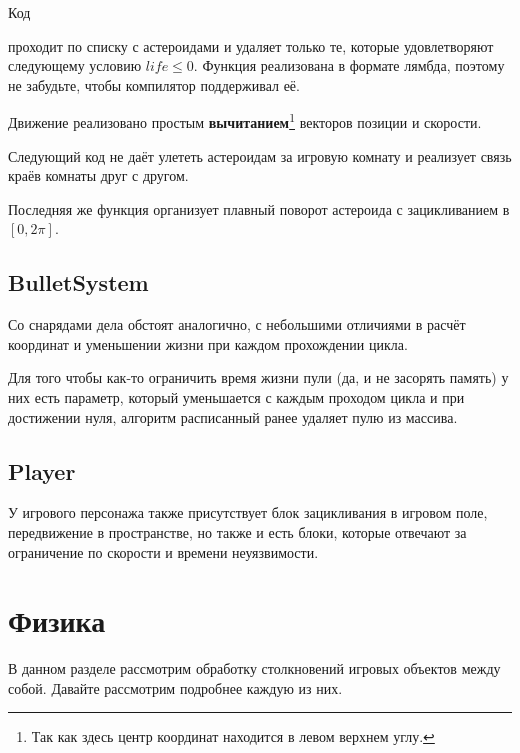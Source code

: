 Код

проходит по списку с астероидами и удаляет только те, которые удовлетворяют следующему условию 
\( life \leq 0 \). Функция реализована в формате лямбда, поэтому не забудьте, чтобы компилятор поддерживал её.

Движение реализовано простым \textbf{вычитанием}\footnote{Так как здесь центр координат находится в левом 
верхнем углу.} векторов позиции и скорости. 

Следующий код не даёт улететь астероидам за игровую комнату и реализует связь краёв комнаты друг с другом.


Последняя же функция организует плавный поворот астероида с зацикливанием в \( [0, 2\pi] \).


\newpage

\subsection{BulletSystem}
Со снарядами дела обстоят аналогично, с небольшими отличиями в расчёт координат и уменьшении жизни при 
каждом прохождении цикла.


Для того чтобы как-то ограничить время жизни пули (да, и не засорять память) у них есть параметр, который 
уменьшается с каждым проходом цикла и при достижении нуля, алгоритм расписанный ранее удаляет пулю из массива.

\newpage

\subsection{Player}
У игрового персонажа также присутствует блок зацикливания в игровом поле, передвижение в пространстве, но 
также и есть блоки, которые отвечают за ограничение по скорости и времени неуязвимости.


\newpage

\section{Физика}
В данном разделе рассмотрим обработку столкновений игровых объектов между собой. Давайте рассмотрим 
подробнее каждую из них.

